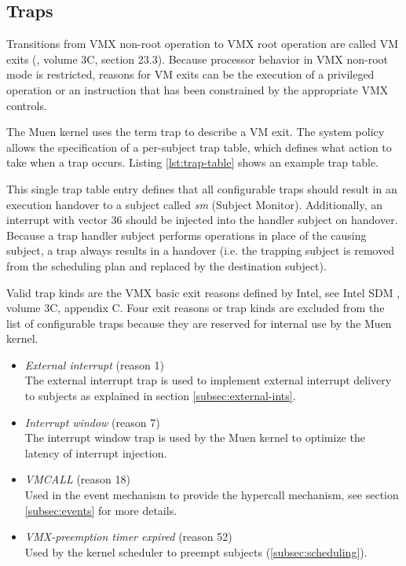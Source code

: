 \subsection{Traps}\label{subsec:traps}
Transitions from VMX non-root operation to VMX root operation are called VM
exits (\cite{IntelSDM}, volume 3C, section 23.3). Because processor behavior in
VMX non-root mode is restricted, reasons for VM exits can be the execution of a
privileged operation or an instruction that has been constrained by the
appropriate VMX controls.

The Muen kernel uses the term trap to describe a VM exit. The system policy
allows the specification of a per-subject trap table, which defines what action
to take when a trap occurs. Listing \ref{lst:trap-table} shows an example trap
table.



This single trap table entry defines that all configurable traps should result
in an execution handover to a subject called \emph{sm} (Subject
Monitor). Additionally, an interrupt with vector 36 should be
injected into the handler subject on handover. Because a trap handler subject
performs operations in place of the causing subject, a trap always results in a
handover (i.e. the trapping subject is removed from the scheduling plan and
replaced by the destination subject).

Valid trap kinds are the VMX basic exit reasons defined by Intel, see Intel SDM
\cite{IntelSDM}, volume 3C, appendix C. Four exit reasons or trap kinds are
excluded from the list of configurable traps because they are reserved for
internal use by the Muen kernel.

\begin{itemize}
	\item \emph{External interrupt} (reason 1)\\
		The external interrupt trap is used to implement external interrupt
		delivery to subjects as explained in section \ref{subsec:external-ints}.
	\item \emph{Interrupt window} (reason 7)\\
		The interrupt window trap is used by the Muen kernel to optimize the
		latency of interrupt injection.
	\item \emph{VMCALL} (reason 18)\\
		Used in the event mechanism to provide the hypercall mechanism, see
		section \ref{subsec:events} for more details.
	\item \emph{VMX-preemption timer expired} (reason 52)\\
		Used by the kernel scheduler to preempt subjects
		(\ref{subsec:scheduling}).
\end{itemize}

